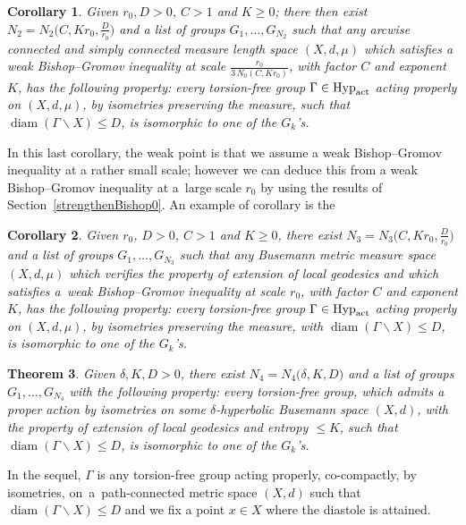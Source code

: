 \documentclass[pdftex]{sigma}
\numberwithin{equation}{section}
\newtheorem{theor}{Theorem}[section]
\newtheorem{Corollary}[theor]{Corollary}
\newcommand{\diam}{\operatorname{diam}}
\begin{document}
\begin{Corollary}\label{majorgroupes2}
Given $r_0, D >0$, $C > 1 $ and $K\ge 0$; there then exist $N_2 = N_2 \big(C, K r_0, \frac{D}{r_0}\big)$ and a list of groups $G_1,\dots, G_{N_2} $
such that any arcwise connected and simply connected measure length space
$(X,d,\mu)$ which satisfies a weak Bishop--Gromov inequality at scale
$\frac{r_0}{3\, N_0 (C, Kr_0)}$, with factor $C$ and exponent $K$, has the following property: every torsion-free group $\Gamma \in {\rm Hyp}_{\rm act}$ acting properly on $(X,d,\mu)$, by isometries preserving the measure, such that $\diam (\Gamma \backslash X) \le D$, is isomorphic to one of the $G_k$'s.
\end{Corollary}

In this last corollary, the weak point is that we assume a weak Bishop--Gromov inequality at a rather small scale; however we can deduce this
from a weak Bishop--Gromov inequality at a~large scale $r_0$ by using the results of Section~\ref{strengthenBishop0}. An example of corollary is the

\begin{Corollary}\label{majorgroupes3}
Given $r_0$, $D >0$, $C > 1 $ and $K\ge 0$, there exist $N_3 = N_3 \big(C, K r_0, \frac{D}{r_0}\big)$ and a list of groups $G_1,\dots, G_{N_3}$
such that any Busemann metric measure space $(X,d,\mu)$ which verifies the property of extension of local
geodesics and which satisfies a~weak Bishop--Gromov inequality at scale $r_0$, with factor $C$ and exponent $K$, has the following property: every torsion-free group
$\Gamma \in \text{\rm Hyp}_{\rm act}$ acting properly on $(X,d,\mu)$, by isometries preserving the measure, with $\diam (\Gamma \backslash X) \le D$, is isomorphic to one of the $G_k$'s.
\end{Corollary}

\begin{theor}\label{majorgroupes5}
Given $\delta, K, D\! >0$, there exist $N_4\! =\! N_4 \big(\delta, K, D \big)$ and a list of groups $G_1,\dots, G_{N_4}$ with the following property:
every torsion-free group, which admits a proper action by isomet\-ries on some $\delta$-hyperbolic Busemann space $(X,d)$, with
the property of extension of local geodesics and entropy $\le K$, such that $\diam (\Gamma \backslash X) \le D$, is isomorphic to one of the $G_k$'s.
\end{theor}



In the sequel, $\Gamma$ is any torsion-free group acting properly, co-compactly, by isometries, on~a~path-connected metric space $(X,d)$ such that
$\diam (\Gamma \backslash X) \le D$ and we fix a point $x \in X$ where the diastole is attained.
\end{document}
